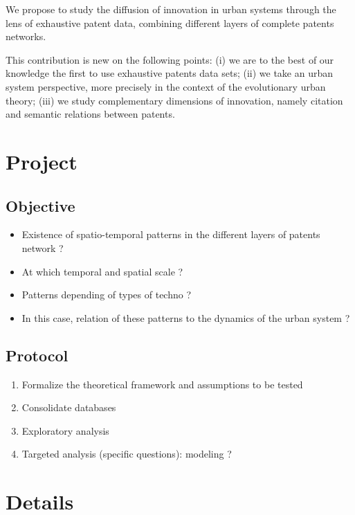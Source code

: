 We propose to study the diffusion of innovation in urban systems through the lens of exhaustive patent data, combining different layers of complete patents networks.

This contribution is new on the following points: (i) we are to the best of our knowledge the first to use exhaustive patents data sets; (ii) we take an urban system perspective, more precisely in the context of the evolutionary urban theory; (iii) we study complementary dimensions of innovation, namely citation and semantic relations between patents.


\section{Project}

\subsection{Objective}

\begin{itemize}
	\item Existence of spatio-temporal patterns in the different layers of patents network ?
    \item At which temporal and spatial scale ?
	\item Patterns depending of types of techno ?
	\item In this case, relation of these patterns to the dynamics of the urban system ?
\end{itemize}



\subsection{Protocol}


\begin{enumerate}
	\item Formalize the theoretical framework and assumptions to be tested
	\item Consolidate databases
	\item Exploratory analysis
	\item Targeted analysis (specific questions): modeling ?
\end{enumerate}



\section{Details}


